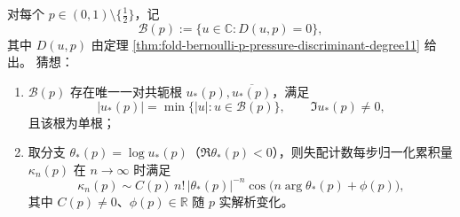 \begin{conjecture}[主导分歧根唯一性与高阶累积量振荡律的参数族延拓]\label{conj:fold-bernoulli-p-dominant-branch-cumulant-oscillation}
对每个 \(p\in(0,1)\setminus\{\tfrac12\}\)，记
\[
\mathcal B(p):=\{u\in\mathbb C: D(u,p)=0\},
\]
其中 \(D(u,p)\) 由定理 \ref{thm:fold-bernoulli-p-pressure-discriminant-degree11} 给出。
猜想：
\begin{enumerate}
  \item \(\mathcal B(p)\) 存在唯一一对共轭根 \(u_\ast(p),\overline{u_\ast(p)}\)，满足
  \[
  |u_\ast(p)|=\min\{|u|:u\in\mathcal B(p)\},\qquad \Im u_\ast(p)\neq 0,
  \]
  且该根为单根；
  \item 取分支 \(\theta_\ast(p)=\log u_\ast(p)\)（\(\Re\theta_\ast(p)<0\)），则失配计数每步归一化累积量 \(\kappa_n(p)\) 在 \(n\to\infty\) 时满足
  \[
  \kappa_n(p)\sim
  C(p)\,n!\,|\theta_\ast(p)|^{-n}
  \cos\!\bigl(n\arg\theta_\ast(p)+\phi(p)\bigr),
  \]
  其中 \(C(p)\neq 0\)、\(\phi(p)\in\mathbb R\) 随 \(p\) 实解析变化。
\end{enumerate}
\end{conjecture}

\endinput
